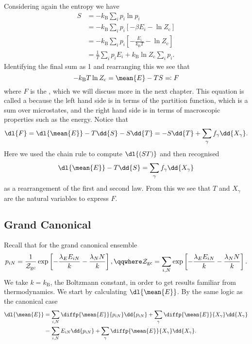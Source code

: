 \documentclass[fleqn]{NotesClass}
\newcommand*{\boltzmann}{k_{\mathrm{B}}}
\newcommand*{\cpartition}{Z_{\mathrm{c}}}
\newcommand*{\gcpartition}{\mathcal{Z}_{\mathrm{gc}}}
\begin{document}
    Considering again the entropy we have
    \begin{align}
        S &= -\boltzmann \sum_i p_i \ln p_i\\
        &= -\boltzmann \sum_i p_i[-\beta E_i - \ln \cpartition]\\
        &= -\boltzmann \sum_i p_i\left[ -\frac{E_i}{\boltzmann T} - \ln \cpartition \right]\\
        &= \frac{1}{T} \sum_i p_iE_i + \boltzmann\ln\cpartition \sum_i p_i.
    \end{align}
    Identifying the final sum as 1 and rearranging this we see that
    \begin{equation}
        -\boltzmann T \ln \cpartition = \mean{E} - TS \eqqcolon F
    \end{equation}
    where \(F\) is the , which we will discuss more in the next chapter.
    This equation is called a  because the left hand side is in terms of the partition function, which is a sum over microstates, and the right hand side is in terms of macroscopic properties such as the energy.
    Notice that
    \begin{equation}
        \dl{F} = \dl{\mean{E}} - T \dd{S} - S\dd{T} = -S\dd{T} + \sum_\gamma f_\gamma \dd{X_\gamma}.
    \end{equation}
    Here we used the chain rule to compute \(\dl{(ST)}\) and then recognised
    \begin{equation}
        \dl{\mean{E}} - T\dd{S} = \sum_\gamma f_\gamma \dd{X_\gamma}
    \end{equation}
    as a rearrangement of the first and second law.
    From this we see that \(T\) and \(X_\gamma\) are the natural variables to express \(F\).
    
    \subsection{Grand Canonical}
    Recall that for the grand canonical ensemble
    \begin{equation}
        p_{iN} = \frac{1}{\gcpartition}\exp\left[ -\frac{\lambda_E E_{iN}}{k} - \frac{\lambda_N N}{k}\right], \qqwhere \gcpartition = \sum_{i, N} \exp\left[ -\frac{\lambda_E E_{iN}}{k} - \frac{\lambda_N N}{k} \right].
    \end{equation}
    We take \(k = \boltzmann\), the Boltzmann constant, in order to get results familiar from thermodynamics.
    We start by calculating \(\dl{\mean{E}}\).
    By the same logic as the canonical case
    \begin{align}
        \dl{\mean{E}} &= \sum_{i,N} \diffp{\mean{E}}{p_{iN}}\dd{p_{iN}} + \sum_{\gamma} \diffp{\mean{E}}{X_\gamma} \dd{X_\gamma}\\
        &= \sum_{i,N} E_{iN} \dd{p_{iN}} + \sum_\gamma \diffp{\mean{E}}{X_\gamma} \dd{X_\gamma}.
    \end{align}
    
\end{document}
